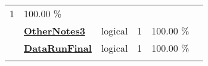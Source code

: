 \documentclass[]{article}
\begin{document}
\begin{longtable}[]{@{}lllrcl@{}}
\begin{minipage}[t]{0.10\columnwidth}
1\strut
\end{minipage} & \begin{minipage}[t]{0.10\columnwidth}\centering\strut
100.00 \%\strut
\end{minipage} & \begin{minipage}[t]{0.12\columnwidth}\raggedright\strut
\strut
\end{minipage}\tabularnewline
\begin{minipage}[t]{0.07\columnwidth}\raggedright\strut
\strut
\end{minipage} & \begin{minipage}[t]{0.35\columnwidth}\raggedright\strut
\textbf{\protect\hyperlink{othernotes3}{OtherNotes3}}\strut
\end{minipage} & \begin{minipage}[t]{0.11\columnwidth}\raggedright\strut
logical\strut
\end{minipage} & \begin{minipage}[t]{0.10\columnwidth}\raggedleft\strut
1\strut
\end{minipage} & \begin{minipage}[t]{0.10\columnwidth}\centering\strut
100.00 \%\strut
\end{minipage} & \begin{minipage}[t]{0.12\columnwidth}\raggedright\strut
\strut
\end{minipage}\tabularnewline
\begin{minipage}[t]{0.07\columnwidth}\raggedright\strut
\strut
\end{minipage} & \begin{minipage}[t]{0.35\columnwidth}\raggedright\strut
\textbf{\protect\hyperlink{datarunfinal}{DataRunFinal}}\strut
\end{minipage} & \begin{minipage}[t]{0.11\columnwidth}\raggedright\strut
logical\strut
\end{minipage} & \begin{minipage}[t]{0.10\columnwidth}\raggedleft\strut
1\strut
\end{minipage} & \begin{minipage}[t]{0.10\columnwidth}\centering\strut
100.00 \%\strut
\end{minipage} & \begin{minipage}[t]{0.12\columnwidth}\raggedright\strut
\strut
\end{minipage}\tabularnewline
\begin{minipage}[t]{0.07\columnwidth}\raggedright\strut
\strut
\end{minipage} & \begin{minipage}[t]{0.35\columnwidth}\raggedright\strut

\end{minipage}
\end{longtable}
\end{document}

